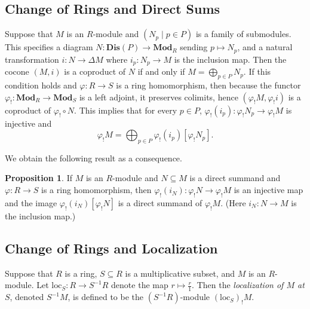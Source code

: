 \documentclass[oneside,11pt]{amsart}
\newcommand{\bMod}{\ensuremath{\textbf{Mod}}}
\newcommand{\bDis}{\ensuremath{\textbf{Dis}}}
\newcommand{\loc}{\ensuremath{\text{loc}}}
\theoremstyle{definition}
\newtheorem{proof techniques}{Proof Techniques}
\newtheorem{proposition}{Proposition}
\begin{document}

\subsection{Change of Rings and Direct Sums} 

Suppose that $M$ is an $R$-module and $(N_p \mid p \in P)$ is a family of submodules. This specifies a diagram $N : \bDis(P) \to \bMod_R$ sending $p \mapsto N_p$, and a natural transformation $i : N \to \Delta M$ where $i_p : N_p \to M$ is the inclusion map. Then the cocone $(M, i)$ is a coproduct of $N$ if and only if $M = \bigoplus_{p \in P} N_p$. If this condition holds and $\varphi : R \to S$ is a ring homomorphism, then because the functor $\varphi_! : \bMod_R \to \bMod_S$ is a left adjoint, it preserves colimits, hence $(\varphi_! M , \varphi_! i)$ is a coproduct of $\varphi_! \circ N$. This implies that for every $p \in P$, $\varphi_! (i_p) : \varphi_! N_p  \to \varphi_! M$ is injective and
\begin{equation}\label{eq: extension of scalars preserves direct sums}
\varphi_! M = \bigoplus_{p \in P} \varphi_!(i_p)[ \varphi_! N_p].
\end{equation}

We obtain the following result as a consequence.

\begin{proposition}\label{prop: extension of scalars applied to direct summands are direct summands}
If $M$ is an $R$-module and $N \subseteq M$ is a direct summand and $\varphi : R \to S$ is a ring homomorphism, then $\varphi_!(i_N) : \varphi_! N \to \varphi_! M$ is an injective map and the image $\varphi_!(i_N)[\varphi_! N]$ is a direct summand of $\varphi_! M$. (Here $i_N : N \to M$ is the inclusion map.) 
\end{proposition}


\subsection{Change of Rings and Localization} 

Suppose that $R$ is a ring, $S \subseteq R$ is a multiplicative subset, and $M$ is an $R$-module. Let $\loc_S: R \to S^{-1}R$ denote the map $r \mapsto \frac{r}{1}$. Then the \emph{localization of $M$ at $S$}, denoted $S^{-1} M$, is defined to be the $(S^{-1}R)$-module $(\loc_S)_! M$. 
\end{document}
